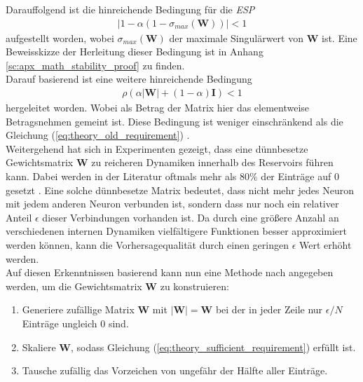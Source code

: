 Darauffolgend ist die hinreichende Bedingung für die \textit{ESP}
\begin{align}
\label{eq:theory_old_requirement}
|1-\alpha(1-\sigma_{max}(\mathbf{W}))| < 1
\end{align}
aufgestellt worden, wobei $\sigma_{max}(\mathbf{W})$ der maximale Singulärwert von $\mathbf{W}$ ist. Eine Beweisskizze der Herleitung dieser Bedingung ist in Anhang \ref{sc:apx_math_stability_proof} zu finden.\\

Darauf basierend ist eine weitere hinreichende Bedingung
\begin{align}
\label{eq:theory_sufficient_requirement}
\rho(\alpha |\mathbf{W}|+(1-\alpha) \mathbf{I}) < 1
\end{align}
hergeleitet worden. Wobei als Betrag der Matrix hier das elementweise Betragsnehmen gemeint ist. Diese Bedingung ist weniger einschränkend als die Gleichung (\ref{eq:theory_old_requirement}) \cite{yildiz}.\\


Weitergehend hat sich in Experimenten gezeigt, dass eine dünnbesetze Gewichtsmatrix $\mathbf{W}$ zu reicheren Dynamiken innerhalb des Reservoirs führen kann. Dabei werden in der Literatur oftmals mehr als $80\%$ der Einträge auf $0$ gesetzt \citep{jaeger2010}. Eine solche dünnbesetze Matrix bedeutet, dass nicht mehr jedes Neuron mit jedem anderen Neuron verbunden ist, sondern dass nur noch ein relativer Anteil $\epsilon$ dieser Verbindungen vorhanden ist. Da durch eine größere Anzahl an verschiedenen internen Dynamiken vielfältigere Funktionen besser approximiert werden können, kann die Vorhersagequalität durch einen geringen $\epsilon$ Wert erhöht werden.\\

Auf diesen Erkenntnissen basierend kann nun eine Methode nach \cite{yildiz} angegeben werden, um die Gewichtsmatrix $\mathbf{W}$ zu konstruieren:

\singlespacing
\begin{enumerate}
	\item Generiere zufällige Matrix $\mathbf{W}$ mit $\mathbf{|W|} = \mathbf{W}$ bei der in jeder Zeile nur $\epsilon/N$ Einträge ungleich $0$ sind.
	\item Skaliere $\mathbf{W}$, sodass Gleichung (\ref{eq:theory_sufficient_requirement}) erfüllt ist.
	\item Tausche zufällig das Vorzeichen von ungefähr der Hälfte aller Einträge.
\end{enumerate}
\onehalfspacing

